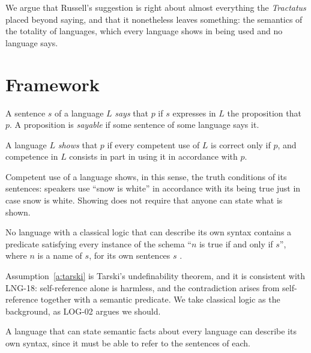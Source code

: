 \documentclass{situationist-preprint}
\begin{document}
We argue that Russell's suggestion is right about almost everything the \emph{Tractatus} placed beyond saying, and that it nonetheless leaves something: the semantics of the totality of languages, which every language shows in being used and no language says.

\section{Framework}

\begin{definition}[Saying]\label{d:say}
A sentence $s$ of a language $L$ \emph{says} that $p$ if $s$ expresses in $L$ the proposition that $p$. A proposition is \emph{sayable} if some sentence of some language says it.
\end{definition}

\begin{definition}[Showing]\label{d:show}
A language $L$ \emph{shows} that $p$ if every competent use of $L$ is correct only if $p$, and competence in $L$ consists in part in using it in accordance with $p$.
\end{definition}

Competent use of a language shows, in this sense, the truth conditions of its sentences: speakers use \enquote{snow is white} in accordance with its being true just in case snow is white. Showing does not require that anyone can state what is shown.

\begin{assumption}[Tarski]\label{a:tarski}
No language with a classical logic that can describe its own syntax contains a predicate satisfying every instance of the schema \enquote{$n$ is true if and only if $s$}, where $n$ is a name of $s$, for its own sentences $s$ \citep{Tarski1956}.
\end{assumption}

Assumption~\ref{a:tarski} is Tarski's undefinability theorem, and it is consistent with LNG-18: self-reference alone is harmless, and the contradiction arises from self-reference together with a semantic predicate. We take classical logic as the background, as LOG-02 argues we should.

\begin{assumption}\label{a:self}
A language that can state semantic facts about every language can describe its own syntax, since it must be able to refer to the sentences of each.
\end{assumption}
\end{document}

